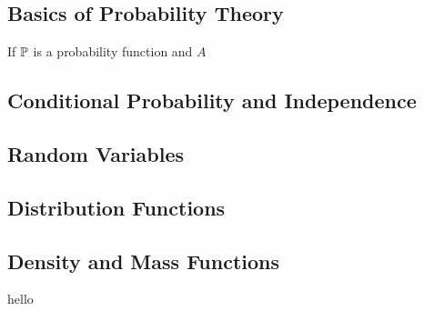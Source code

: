 \subsection{Basics of Probability Theory}
\begin{definition}

\end{definition}

\begin{definition}

\end{definition}

\begin{theorem}
If $\mathbb P$ is a probability function and $A$ 

\end{theorem}

\subsection{Conditional Probability and Independence}

\subsection{Random Variables}

\subsection{Distribution Functions}

\subsection{Density and Mass Functions}

\begin{question}
hello
\end{question}